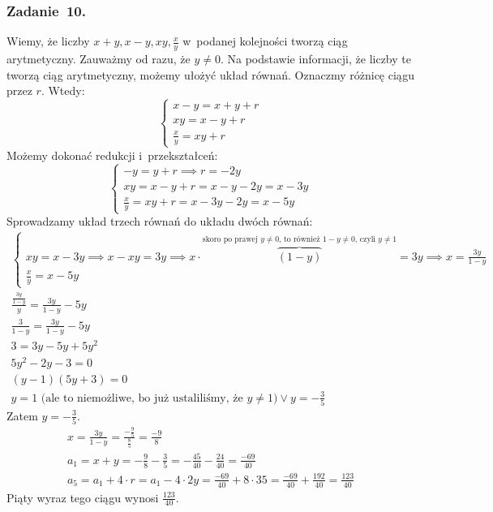 \subsubsection*{Zadanie~10.}
Wiemy, że liczby \(x + y, x - y, xy, \frac{x}{y}\) w~podanej kolejności tworzą ciąg arytmetyczny. Zauważmy od razu, że \(y \neq 0\). Na podstawie informacji, że liczby te tworzą ciąg arytmetyczny, możemy ułożyć układ równań. Oznaczmy różnicę ciągu przez \(r\). Wtedy:
\begin{equation*}
    \begin{cases}
        x - y = x + y + r\\
        xy = x - y + r\\
        \frac{x}{y} = xy + r
    \end{cases}
\end{equation*}
Możemy dokonać redukcji i~przekształceń:
\begin{equation*}
    \begin{cases}
        -y = y + r \implies r = -2y\\
        xy = x - y + r = x - y - 2y = x - 3y\\
        \frac{x}{y} = xy + r = x - 3y - 2y = x - 5y
    \end{cases}
\end{equation*}
Sprowadzamy układ trzech równań do układu dwóch równań:
\begin{gather*}
    \begin{cases}
        xy = x - 3y \implies x - xy = 3y \implies x \cdot {}\overbrace{(1 - y)}^{\text{skoro po prawej \(y \neq 0\), to również \(1 - y \neq 0\), czyli \(y \neq 1\)}} = 3y \implies x = \frac{3y}{1 - y}\\
        \frac{x}{y} = x - 5y
    \end{cases}\\
    \frac{\frac{3y}{1 - y}}{y} = \frac{3y}{1 - y} - 5y\\
    \frac{3}{1 - y} =  \frac{3y}{1 - y} - 5y\\
    3 = 3y - 5y + 5y^2\\
    5y^2 - 2y - 3 = 0\\
    (y - 1)(5y + 3) = 0\\
    y = 1 \text{ (ale to niemożliwe, bo już ustaliliśmy, że \(y \neq 1\))} \lor y = -\frac{3}{5}
\end{gather*}
Zatem \(y = -\frac{3}{5}\).
\begin{gather*}
    x = \frac{3y}{1 -  y} = \frac{-\frac{9}{5}}{\frac{8}{5}} = \frac{-9}{8}\\
    a_1 = x + y = -\frac{9}{8} - \frac{3}{5} = -\frac{45}{40} - \frac{24}{40} = \frac{-69}{40}\\
    a_5 = a_1 + 4 \cdot r = a_1 - 4 \cdot 2y = \frac{-69}{40} + 8 \cdot {3}{5} = \frac{-69}{40} + \frac{192}{40} = \frac{123}{40}
\end{gather*}
Piąty wyraz tego ciągu wynosi \(\frac{123}{40}\).

